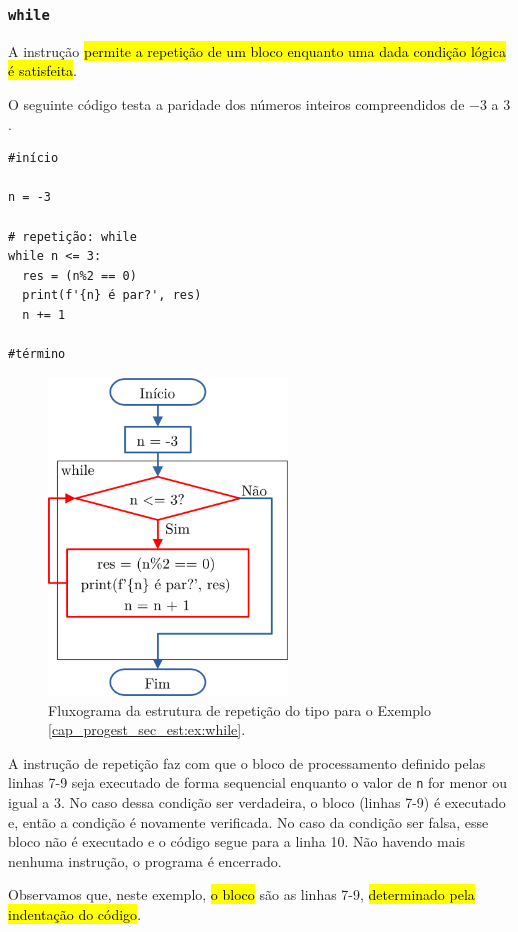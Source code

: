 \subsubsection{\texttt{while}}

A instrução \hl{{\PYTHONwhile} permite a repetição de um bloco enquanto uma dada condição lógica é satisfeita}.

\begin{ex}\label{cap_progest_sec_est:ex:while}
  O seguinte código testa a paridade dos números inteiros compreendidos de $-3$ a $3$.

\begin{lstlisting}
#início

n = -3

# repetição: while
while n <= 3:
  res = (n%2 == 0)
  print(f'{n} é par?', res)
  n += 1
    
#término
\end{lstlisting}

\begin{figure}[ht]
  \centering
  \includegraphics[width=2.5in]{./cap_progest/dados/fig_fg_while_ex/fig.png}
  \caption{Fluxograma da estrutura de repetição do tipo {\PYTHONwhile} para o Exemplo \ref{cap_progest_sec_est:ex:while}.}
  \label{cap_progest_sec_est:fig:fg_while_ex}
\end{figure}


A instrução de repetição {\PYTHONwhile} faz com que o bloco de processamento definido pelas linhas 7-9 seja executado de forma sequencial enquanto o valor de \texttt{n} for menor ou igual a 3. No caso dessa condição ser verdadeira, o bloco (linhas 7-9) é executado e, então a condição é novamente verificada. No caso da condição ser falsa, esse bloco não é executado e o código segue para a linha 10. Não havendo mais nenhuma instrução, o programa é encerrado.

Observamos que, neste exemplo, \hl{o bloco {\PYTHONwhile}} são as linhas 7-9, \hl{determinado pela indentação do código}.
\end{ex}

